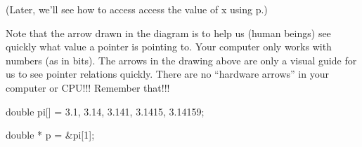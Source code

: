 (Later, we'll see how to access access the value of x using p.)

Note that the arrow drawn in the diagram is to help us (human beings) see quickly what value a pointer is pointing to. Your computer only works with numbers (as in bits). The arrows in the drawing above are only a visual guide for us to see pointer relations quickly. There are no ``hardware arrows'' in your computer or CPU!!! Remember that!!!




\begin{consolethree}[escapeinside=||]

double pi[] = {3.1, 3.14, 3.141, 3.1415, 3.14159};

double * p = &pi[1];
\end{consolethree}




